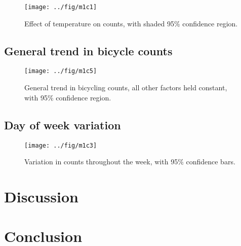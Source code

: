 \documentclass[12pt,letterpaper,article,twocolumn]{memoir}
\begin{document}
\begin{figure}[h!]
  \centering
  \texttt{[image: ../fig/m1c1]}
  \caption{Effect of temperature on counts, with shaded 95\%
    confidence region.}
  \label{fg:temperature}
\end{figure}



\subsection*{General trend in bicycle counts}

\begin{figure}[h!]
  \centering
  \texttt{[image: ../fig/m1c5]}
  \caption{General trend in bicycling counts, all other factors held
    constant, with 95\% confidence region.}
  \label{fg:trend}
\end{figure}



\subsection*{Day of week variation}

\begin{figure}[h!]
  \centering
  \texttt{[image: ../fig/m1c3]}
  \caption{Variation in counts throughout the week, with 95\% confidence bars.}
  \label{fg:dayofweek}
\end{figure}

\clearpage
\section*{Discussion}


\section*{Conclusion}


\printbibliography
\end{document}
